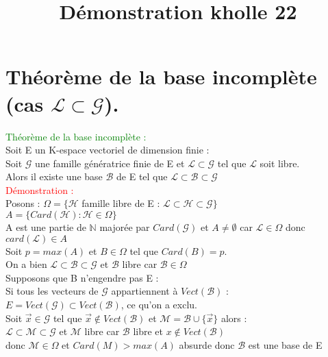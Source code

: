 \documentclass{article}
\begin{document}
\title{Démonstration kholle 22}
\date{}
\maketitle
	\renewcommand{\thesection}{\Roman{section}}
	\setlength{\parindent}{1.5cm}
\section{Théorème de la base incomplète (cas $\mathcal L \subset \mathcal G$).}
\textcolor{green}{Théorème de la base incomplète :} \\
Soit  E un K-espace vectoriel de dimension finie : \\
Soit $ \mathcal G$ une famille génératrice finie de E et $\mathcal L \subset \mathcal G$ tel que $ \mathcal L$ soit libre. \\
Alors il existe une base $\mathcal B$ de E tel que $\mathcal L \subset \mathcal B \subset \mathcal G$ \\
\textcolor{red}{Démonstration :} \\
Posons : $\Omega= \lbrace \mathcal H$ famille libre de E : $ \mathcal L \subset \mathcal H \subset \mathcal G \rbrace$ \\
$A= \lbrace Card(\mathcal H) : \mathcal H \in \Omega \rbrace$ \\
A est une partie de $\mathbb N$ majorée par $Card(\mathcal G)$ et $A \neq \emptyset$ car $ \mathcal L \in \Omega $ donc $card(\mathcal L) \in A$ \\
Soit $p=max(A)$ et $B \in \Omega$ tel que $Card(B)=p$. \\
On a bien $\mathcal L \subset \mathcal B \subset \mathcal G$ et $\mathcal B$ libre car $\mathcal B \in \Omega$ \\
Supposons que B n'engendre pas E : \\
Si tous les vecteurs de $\mathcal G$ appartiennent à $Vect(\mathcal B)$ : \\
$E=Vect(\mathcal G) \subset Vect(\mathcal B)$, ce qu'on a exclu. \\
Soit $\vec x \in \mathcal G$ tel que $\vec x \notin Vect( \mathcal B )$ et $\mathcal M= \mathcal B \cup \lbrace \vec x \rbrace$ alors : \\
$\mathcal L \subset \mathcal M \subset \mathcal G$ et $ \mathcal M$ libre car $ \mathcal B$ libre et $x \notin Vect(\mathcal B)$ \\
donc $\mathcal M \in \Omega$ et $Card(M)>max(A)$ absurde donc $\mathcal B$ est une base de E
\end{document}
